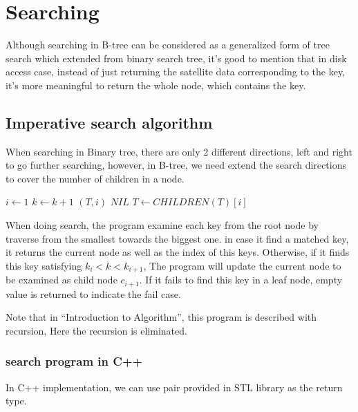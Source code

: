 \documentclass{article}
\begin{document}
\section{Searching}

Although searching in B-tree can be considered as a generalized
form of tree search which extended from binary search tree, it's good
to mention that in disk access case, instead of just returning the
satellite data corresponding to the key, it's more meaningful to
return the whole node, which contains the key.

\subsection{Imperative search algorithm}

When searching in Binary tree, there are only 2 different directions,
left and right to go further searching, however, in B-tree, we need
extend the search directions to cover the number of children in a
node.

\begin{algorithmic}[1]
  \Loop
    \State $i \gets 1$
      \State $k \gets k+1$
    \EndWhile
      \State \Return $(T, i)$
    \EndIf
      \State \Return $NIL$ 
    \Else
      \State $T \gets CHILDREN(T)[i]$
    \EndIf
  \EndLoop
\EndFunction
\end{algorithmic}

When doing search, the program examine each key from the root node by
traverse from the smallest towards the biggest one. in case it find a
matched key, it returns the current node as well as the index of this
keys. Otherwise, if it finds this key satisfying $k_i < k < k_{i+1}$,
The program will update the current node to be examined as child node
$c_{i+1}$. If it
fails to find this key in a leaf node, empty value is returned to
indicate the fail case.

Note that in ``Introduction to Algorithm'', this program is described
with recursion, Here the recursion is eliminated.

\subsubsection*{search program in C++}
In C++ implementation, we can use pair provided in STL library as
the return type.
\end{document}

